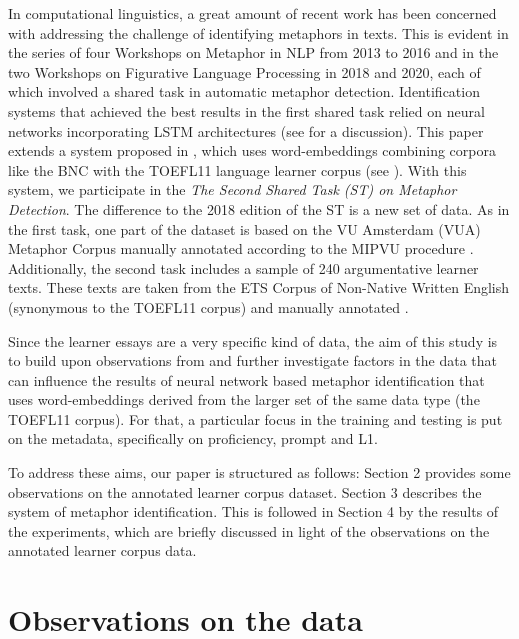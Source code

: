 \documentclass[11pt,a4paper]{article}
\begin{document}
In computational linguistics, a great amount of recent work has been concerned with addressing the challenge of identifying metaphors in texts. This is evident in the series of four Workshops on Metaphor in NLP from 2013 to 2016 and in the two Workshops on Figurative Language Processing in 2018 and 2020, each of which involved a shared task in automatic metaphor detection. Identification systems that achieved the best results in the first shared task relied on neural networks incorporating LSTM architectures (see \citealp{mu-EtAl:2019} for a discussion). 
This paper extends a system proposed in \citet{stemle-onysko:2018:naacl-flpst}, which uses word-embeddings combining corpora like the BNC with the TOEFL11 language learner corpus (see \citealp{Blanchard-EtAl:TOEFL11}). With this system, we participate in the \emph{The Second Shared Task (ST) on Metaphor Detection}. The difference to the 2018 edition of the ST is a new set of data. As in the first task, one part of the dataset is based on the VU Amsterdam (VUA) Metaphor Corpus manually annotated according to the MIPVU procedure \citep{Steen2010}. Additionally, the second task includes a sample of 240 argumentative learner texts. These texts are taken from the ETS Corpus of Non-Native Written English (synonymous to the TOEFL11 corpus) and manually annotated \citep{beigmanklebanov-EtAl:2018}. 

Since the learner essays are a very specific kind of data, the aim of this study is to build upon observations from \citet{stemle-onysko:2018:naacl-flpst} and further investigate factors in the data that can influence the results of neural network based metaphor identification that uses word-embeddings derived from the larger set of the same data type (the TOEFL11 corpus). For that, a particular focus in the training and testing is put on the metadata, specifically on proficiency, prompt and L1. 

To address these aims, our paper is structured as follows: Section 2 provides some observations on the annotated learner corpus dataset. Section 3 describes the system of metaphor identification. This is followed in Section 4 by the results of the experiments, which are briefly discussed in light of the observations on the annotated learner corpus data. 

\section{Observations on the data}
\end{document}
